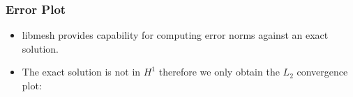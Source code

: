 \frame
{
  \frametitle{Error Plot}
  \begin{itemize}[<+->]
    \item libmesh provides capability for computing error norms against an exact solution.
    \item The exact solution is not in $H^1$ therefore we only obtain
the $L_2$ convergence plot:
      \begin{figure}[!htb]
      \begin{center}
      \end{center}
      \end{figure}
  \end{itemize}
}

